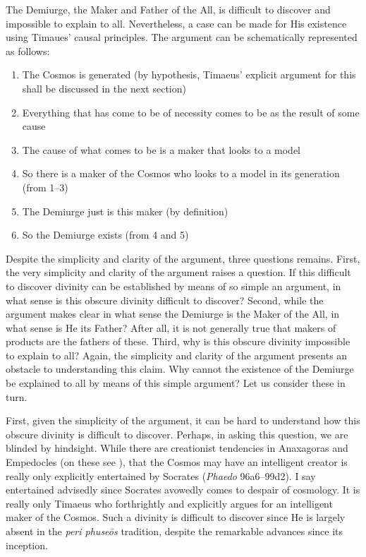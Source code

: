 The Demiurge, the Maker and Father of the All, is difficult to discover and impossible to explain to all. Nevertheless, a case can be made for His existence using Timaues' causal principles. The argument can be schematically represented as follows:
\begin{enumerate}[(1)]
	\item The Cosmos is generated (by hypothesis, Timaeus' explicit argument for this shall be discussed in the next section)
	\item Everything that has come to be of necessity comes to be as the result of some cause
	\item The cause of what comes to be is a maker that looks to a model
	\item So there is a maker of the Cosmos who looks to a model in its generation (from 1--3)
	\item The Demiurge just is this maker (by definition)
	\item So the Demiurge exists (from 4 and 5)
\end{enumerate}

Despite the simplicity and clarity of the argument, three questions remains. First, the very simplicity and clarity of the argument raises a question. If this difficult to discover divinity can be established by means of so simple an argument, in what sense is this obscure divinity difficult to discover? Second, while the argument makes clear in what sense the Demiurge is the Maker of the All, in what sense is He its Father? After all, it is not generally true that makers of products are the fathers of these. Third, why is this obscure divinity impossible to explain to all? Again, the simplicity and clarity of the argument presents an obstacle to understanding this claim. Why cannot the existence of the Demiurge be explained to all by means of this simple argument? Let us consider these in turn.

First, given the simplicity of the argument, it can be hard to understand how this obscure divinity is difficult to discover. Perhaps, in asking this question, we are blinded by hindsight. While there are creationist tendencies in Anaxagoras and Empedocles (on these see \citealt[chapters 1 and 2]{Sedley:2007pi}), that the Cosmos may have an intelligent creator is really only explicitly entertained by Socrates (\emph{Phaedo} 96a6–99d2). I say entertained advisedly since Socrates avowedly comes to despair of cosmology. It is really only Timaeus who forthrightly and explicitly argues for an intelligent maker of the Cosmos. Such a divinity is difficult to discover since He is largely absent in the \emph{peri phuseōs} tradition, despite the remarkable advances since its inception.

